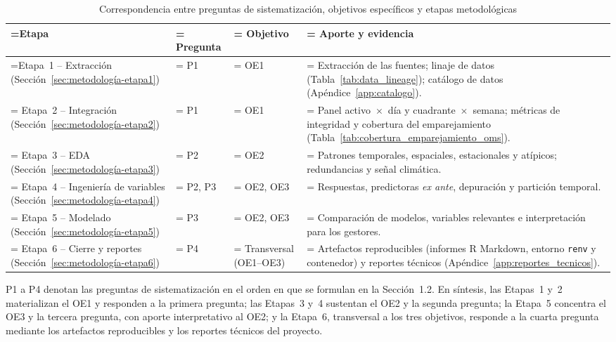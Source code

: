 \begin{table}[!htbp]
\centering
\small
\caption{Correspondencia entre preguntas de sistematización, objetivos específicos y etapas metodológicas}
\label{tab:etapas_objetivos}
\begin{tabularx}{\linewidth}{@{} >{\raggedright\arraybackslash\hsize=0.900\hsize\linewidth=\hsize}X >{\centering\arraybackslash\hsize=0.500\hsize\linewidth=\hsize}X >{\centering\arraybackslash\hsize=0.650\hsize\linewidth=\hsize}X >{\raggedright\arraybackslash\hsize=1.950\hsize\linewidth=\hsize}X @{}}
\toprule
\textbf{Etapa} & \textbf{Pregunta} & \textbf{Objetivo} & \textbf{Aporte y evidencia} \\
\midrule
Etapa~1 -- Extracción (Sección~\ref{sec:metodología-etapa1}) & P1 & OE1 & Extracción de las fuentes; linaje de datos (Tabla~\ref{tab:data_lineage}); catálogo de datos (Apéndice~\ref{app:catalogo}). \\
\addlinespace
Etapa~2 -- Integración (Sección~\ref{sec:metodología-etapa2}) & P1 & OE1 & Panel activo~$\times$~día y cuadrante~$\times$~semana; métricas de integridad y cobertura del emparejamiento (Tabla~\ref{tab:cobertura_emparejamiento_oms}). \\
\addlinespace
Etapa~3 -- EDA (Sección~\ref{sec:metodología-etapa3}) & P2 & OE2 & Patrones temporales, espaciales, estacionales y atípicos; redundancias y señal climática. \\
\addlinespace
Etapa~4 -- Ingeniería de variables (Sección~\ref{sec:metodología-etapa4}) & P2, P3 & OE2, OE3 & Respuestas, predictoras \emph{ex ante}, depuración y partición temporal. \\
\addlinespace
Etapa~5 -- Modelado (Sección~\ref{sec:metodología-etapa5}) & P3 & OE2, OE3 & Comparación de modelos, variables relevantes e interpretación para los gestores. \\
\addlinespace
Etapa~6 -- Cierre y reportes (Sección~\ref{sec:metodología-etapa6}) & P4 & Transversal (OE1--OE3) & Artefactos reproducibles (informes R Markdown, entorno \texttt{renv} y contenedor) y reportes técnicos (Apéndice~\ref{app:reportes_tecnicos}). \\
\bottomrule
\end{tabularx}
\end{table}

\noindent P1 a P4 denotan las preguntas de sistematización en el orden en que se formulan en la Sección~1.2. En síntesis, las Etapas~1 y~2 materializan el OE1 y responden a la primera pregunta; las Etapas~3 y~4 sustentan el OE2 y la segunda pregunta; la Etapa~5 concentra el OE3 y la tercera pregunta, con aporte interpretativo al OE2; y la Etapa~6, transversal a los tres objetivos, responde a la cuarta pregunta mediante los artefactos reproducibles y los reportes técnicos del proyecto.
